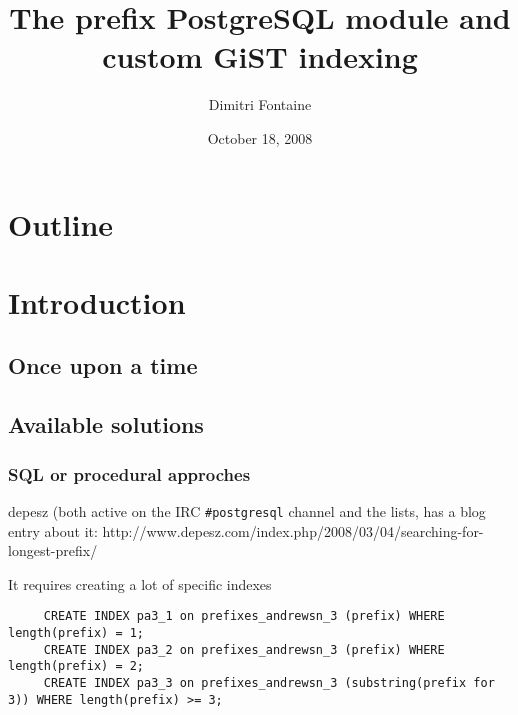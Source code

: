 \documentclass{beamer}
\title{The prefix PostgreSQL module and custom GiST indexing}
\author{Dimitri Fontaine}
\date{October 18, 2008}
\begin{document}
\frame{\titlepage}

\section*{Outline}

\section{Introduction}
\subsection{Once upon a time}


\subsection{Available solutions}

\begin{frame}[fragile]
  \frametitle{SQL or procedural approches}
  
  depesz (both active on the IRC \texttt{\#postgresql} channel and the lists, has a blog entry
  about it: http://www.depesz.com/index.php/2008/03/04/searching-for-longest-prefix/
  
  It requires creating a lot of specific indexes
  
  \begin{example}
  \begin{verbatim}
     CREATE INDEX pa3_1 on prefixes_andrewsn_3 (prefix) WHERE length(prefix) = 1;
     CREATE INDEX pa3_2 on prefixes_andrewsn_3 (prefix) WHERE length(prefix) = 2;
     CREATE INDEX pa3_3 on prefixes_andrewsn_3 (substring(prefix for 3)) WHERE length(prefix) >= 3;
  \end{verbatim}
  \end{example}
\end{frame}
\end{document}
